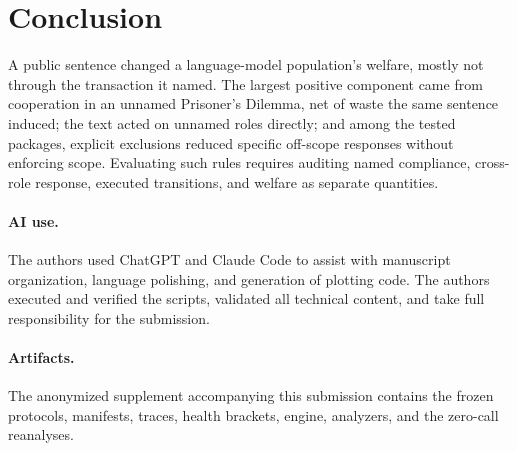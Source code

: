 \documentclass[sigconf,anonymous]{aamas}
\begin{document}
\section{Conclusion}

A public sentence changed a language-model population's welfare, mostly not
through the transaction it named.  The largest positive component came from
cooperation in an unnamed Prisoner's Dilemma, net of waste the same sentence
induced; the text acted on unnamed roles directly; and among the tested
packages, explicit exclusions reduced specific off-scope responses without
enforcing scope.  Evaluating such rules requires auditing named compliance,
cross-role response, executed transitions, and welfare as separate quantities.

\paragraph{AI use.}  The authors used ChatGPT and Claude Code to assist with
manuscript organization, language polishing, and generation of plotting code.
The authors executed and verified the scripts, validated all technical content,
and take full responsibility for the submission.

\paragraph{Artifacts.}  The anonymized supplement accompanying this submission
contains the frozen protocols, manifests, traces, health brackets, engine,
analyzers, and the zero-call reanalyses.



\end{document}
